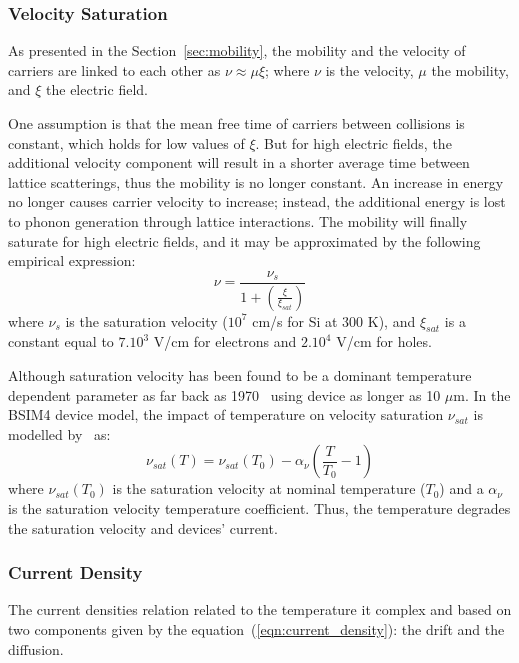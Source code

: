 \subsubsection{Velocity Saturation}    %
As presented in the Section~\ref{sec:mobility}, the mobility and the velocity of carriers are linked to each other as \(\nu \approx \mu \xi \); where \(\nu \) is the velocity, \(\mu \) the mobility, and \(\xi \) the electric field.

One assumption is that the mean free time of carriers between collisions is constant, which holds for low values of \(\xi \). But for high electric fields, the additional velocity component will result in a shorter average time between lattice scatterings, thus the mobility is no longer constant. An increase in energy no longer causes carrier velocity to increase; instead, the additional energy is lost to phonon generation through lattice interactions. The mobility will finally saturate for high electric fields, and it may be approximated by the following empirical expression:
\begin{equation}
\label{eqn:vsat}
\nu = \frac{\nu_s}{1 + \left(\frac{\xi}{\xi_{sat}}\right)}
\end{equation}
where \(\nu_s \) is the saturation velocity (\(10^7 \) cm/s for Si at 300 K), and \(\xi_{sat}\) is a constant equal to \(7.10^3 \) V/cm for electrons and \(2.10^4 \) V/cm for holes.

Although saturation velocity has been found to be a dominant temperature dependent parameter as far back as 1970~\cite{Fowler1970} using device as longer as 10 \(\mu \)m. In the BSIM4 device model, the impact of temperature on velocity saturation \(\nu_{sat} \) is modelled by~\cite{Chain1997} as:
\begin{equation}
\label{eqn:vsat_T}
\nu_{sat}(T) = \nu_{sat}(T_0) - \alpha_\nu \left(\frac{T}{T_0}-1\right)
\end{equation}
where \(\nu_{sat}(T_0)\) is the saturation velocity at nominal temperature (\(T_0 \)) and a \(\alpha_\nu \) is the saturation velocity temperature coefficient. Thus, the temperature degrades the saturation velocity and devices' current.

\subsubsection{Current Density}        %
\label{sec:current_density}
The current densities relation related to the temperature it complex and based on two components given by the equation~(\ref{eqn:current_density}): the drift and the diffusion.

